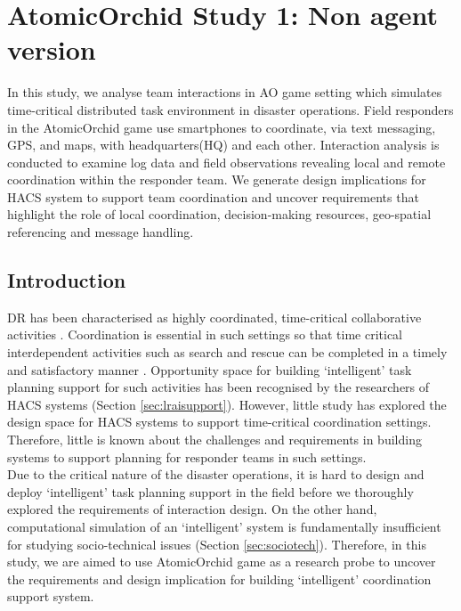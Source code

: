 \chapter{AtomicOrchid Study 1: Non agent version}\label{ch:studyone} %
In this study, we analyse team interactions in \acf{AO} game setting which simulates time-critical distributed task environment in disaster operations. Field responders in the AtomicOrchid game use smartphones to coordinate, via text messaging, GPS, and maps, with headquarters(HQ) and each other. Interaction analysis is conducted to examine log data and field observations revealing local and remote coordination within the responder team. We generate design implications for \ac{HACS} system to support team coordination and uncover requirements that highlight the role of local coordination, decision-making resources, geo-spatial referencing and message handling. \\


\section{Introduction}
\acf{DR} has been characterised as highly coordinated, time-critical collaborative activities  \cite{Mendonca2007}. Coordination is essential in such settings so that time critical interdependent activities such as search and rescue can be completed in a timely and satisfactory manner \cite{Bradshaw2011}. Opportunity space for building `intelligent' task planning support for  such activities has been recognised by the researchers of \ac{HACS} systems (Section \ref{sec:lraisupport}). However, little study has explored the  design space for \ac{HACS} systems to support time-critical coordination settings. Therefore, little is known about the challenges and requirements in building systems to support planning for responder teams in such settings.\\

Due to the critical nature of the disaster operations, it is hard to design and deploy `intelligent' task planning support in the field before we thoroughly explored the requirements of interaction design. On the other hand, computational simulation of an `intelligent' system is fundamentally insufficient for studying socio-technical issues (Section \ref{sec:sociotech}). Therefore, in this study, we are aimed to use AtomicOrchid game as a research probe to uncover the requirements and design implication for building `intelligent' coordination support system. \\

